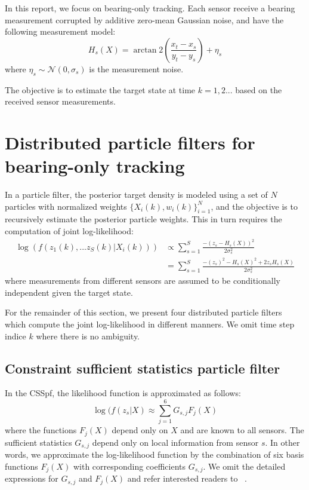 \documentclass[10pt,letterpaper,final]{article}
\begin{document}
In this report, we focus on bearing-only tracking. Each sensor receive a bearing measurement corrupted by additive zero-mean Gaussian noise, and have the following measurement model:
\begin{equation}
H_s(X)= \arctan2 \left( \frac{x_t-x_s}{y_t-y_s} \right) + \eta_s
\label{eqn:bearing}
\end{equation}
where $\eta_s \sim \mathcal{N}(0, \sigma_s)$ is the measurement noise. 

The objective is to estimate the target state at time $k=1,2...$ based on the received sensor measurements. 

\section{Distributed particle filters for bearing-only tracking}
\label{sec:pf}
In a particle filter, the posterior target density is modeled using a set of $N$ particles with normalized weights $\{X_i(k), w_i(k)\}_{i=1}^N$, and the objective is to recursively estimate the posterior particle weights. This in turn requires the computation of joint log-likelihood:
\begin{align}
\log(f(z_1(k),...z_S(k)|X_i(k))) &\propto \sum_{s=1}^S \frac{-(z_s-H_s(X))^2}{2\sigma_s^2} \nonumber \\ 
&= \sum_{s=1}^S \frac{-(z_s)^2-H_s(X)^2+2z_sH_s(X)}{2\sigma_s^2} \label{eqn:log_lh_normal}
\end{align}
where measurements from different sensors are assumed to be conditionally independent given the target state. 

For the remainder of this section, we present four distributed particle filters which compute the joint log-likelihood in different manners. We omit time step indice $k$ where there is no ambiguity. 

\subsection{Constraint sufficient statistics particle filter}
In the CSSpf, the likelihood function is approximated as follows:
\begin{equation}
\log(f(z_s|X) \approx \sum_{j=1}^6 G_{s,j}F_j(X)
\end{equation}
where the functions $F_j(X)$ depend only on $X$ and are known to all sensors. The sufficient statistics $G_{s,j}$ depend only on local information from sensor $s$. In other words, we approximate the log-likelihood function by the combination of six basis functions $F_j(X)$ with corresponding coefficients $G_{s,j}$. We omit the detailed expressions for $G_{s,j}$ and $F_j(X)$ and refer interested readers to ~\cite{}. 
\end{document}

